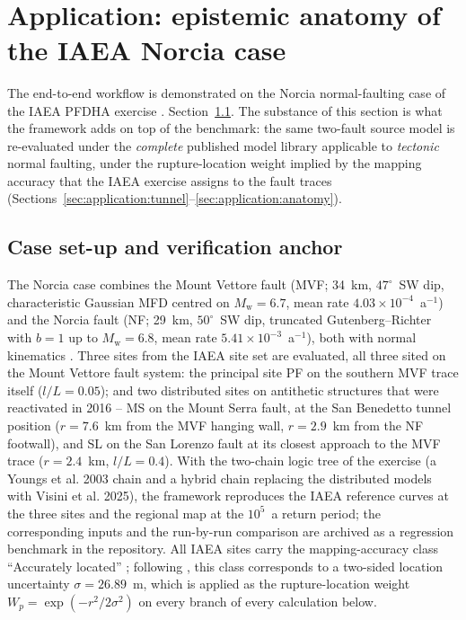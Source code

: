 \
\section{Application: epistemic anatomy of the IAEA Norcia case}
\label{sec:application}

The end-to-end workflow is demonstrated on the Norcia normal-faulting
case of the IAEA PFDHA exercise \citep[Section~7]{IAEA2025TECDOC2092}.
Section~\ref{sec:application:anchor}. The
substance of this section is what the framework adds on top of the
benchmark: the same two-fault source model is re-evaluated under the
\emph{complete} published model library applicable to \emph{tectonic}
normal faulting,
under the rupture-location weight implied by the mapping accuracy that
the IAEA exercise assigns to the fault traces
(Sections~\ref{sec:application:tunnel}--\ref{sec:application:anatomy}).

\subsection{Case set-up and verification anchor}
\label{sec:application:anchor}

The Norcia case combines the Mount Vettore fault (MVF; 34~km,
$47^\circ$~SW dip, characteristic Gaussian MFD centred on
$M_{\mathrm{w}} = 6.7$, mean rate $4.03 \times 10^{-4}$~a$^{-1}$) and
the Norcia fault (NF; 29~km, $50^\circ$~SW dip, truncated
Gutenberg--Richter with $b = 1$ up to $M_{\mathrm{w}} = 6.8$, mean rate
$5.41 \times 10^{-3}$~a$^{-1}$), both with normal kinematics
\citep[Table~14]{IAEA2025TECDOC2092}. Three sites from the IAEA site
set \citep[Table~13]{IAEA2025TECDOC2092} are evaluated, all three
sited on the Mount Vettore fault system: the principal site PF on the
southern MVF trace itself ($l/L = 0.05$); and two distributed sites on
antithetic structures that were reactivated in 2016 -- MS on the Mount
Serra fault, at the San Benedetto tunnel position ($r = 7.6$~km from
the MVF hanging wall, $r = 2.9$~km from the NF footwall), and SL on the
San Lorenzo fault at its closest approach to the MVF trace
($r = 2.4$~km, $l/L = 0.4$). With the two-chain logic tree
of the exercise (a Youngs et al. 2003 chain and a hybrid chain
replacing the distributed models with Visini et al. 2025), the
framework reproduces the IAEA reference curves at the three sites and
the regional map at the $10^{5}$~a return period; the corresponding
inputs and the run-by-run comparison are archived as a regression
benchmark in the repository. All IAEA sites carry the mapping-accuracy class ``Accurately located''
\citep[Table~13]{IAEA2025TECDOC2092}; following
\citet[Table~2]{Petersen2011}, this class corresponds to a two-sided
location uncertainty $\sigma = 26.89$~m, which is applied as the
rupture-location weight $W_p = \exp(-r^{2}/2\sigma^{2})$ on every
branch of every calculation below.

